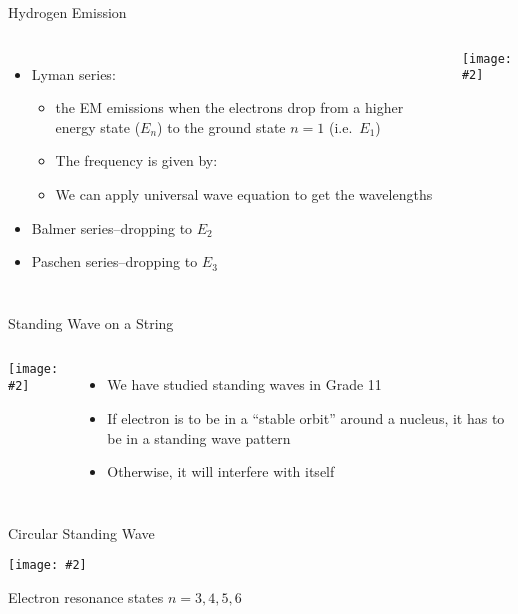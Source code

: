 \documentclass[12pt,compress,aspectratio=169]{beamer}
\newcommand{\pic}[2]{\texttt{[image: \#2]}}
\newcommand{\eq}[2]{\vspace{#1}{\Large\begin{displaymath}#2\end{displaymath}}}
\begin{document}
\begin{frame}{Hydrogen Emission}
  \begin{columns}

    \begin{itemize}
    \item Lyman series:
      \begin{itemize}
      \item the EM emissions when the electrons drop from a higher energy state
        ($E_n$) to the ground state $n=1$ (i.e.\ $E_1$)
      \item The frequency is given by:
        
        \eq{-.2in}{
          f=\frac{E_1-E_n}{h}
        }
      \item We can apply universal wave equation to get the wavelengths
      \end{itemize}
    \item Balmer series--dropping to $E_2$
    \item Paschen series--dropping to $E_3$
    \end{itemize}

    \pic{1}{400px-Hydrogen_transitions}
  \end{columns}
\end{frame}


\begin{frame}{Standing Wave on a String}
  \begin{columns}
    \pic{1}{strhar}

    \begin{itemize}
    \item We have studied standing waves in Grade 11
    \item If electron is to be in a ``stable orbit'' around a nucleus, it has
      to be in a standing wave pattern
    \item Otherwise, it will interfere with itself
    \end{itemize}
  \end{columns}
\end{frame}


\begin{frame}{Circular Standing Wave}
  \begin{center}
    \pic{.7}{oo1wp}
  \end{center}
  Electron resonance states $n=3,4,5,6$
\end{frame}
\end{document}
